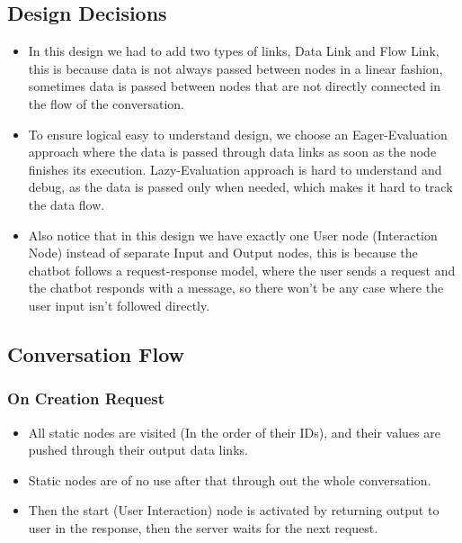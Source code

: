 \subsection{Design Decisions}

\begin{itemize}
    \item In this design we had to add two types of links, Data Link and Flow Link, this is because data is not always passed between nodes in a linear fashion, sometimes data is passed between nodes that are not directly connected in the flow of the conversation.
    \item To ensure logical easy to understand design, we choose an Eager-Evaluation approach where the data is passed through data links as soon as the node finishes its execution. Lazy-Evaluation approach is hard to understand and debug, as the data is passed only when needed, which makes it hard to track the data flow.
    \item Also notice that in this design we have exactly one User node (Interaction Node) instead of separate Input and Output nodes, this is because the chatbot follows a request-response model, where the user sends a request and the chatbot responds with a message, so there won't be any case where the user input isn't followed directly.
\end{itemize}

\subsection{Conversation Flow}

\subsubsection{On Creation Request}
\begin{itemize}
    \item All static nodes are visited (In the order of their IDs), and their values are pushed through their output data links.
    \item Static nodes are of no use after that through out the whole conversation.
    \item Then the start (User Interaction) node is activated by returning output to  user in the response, then the server waits for the next request.
\end{itemize}

